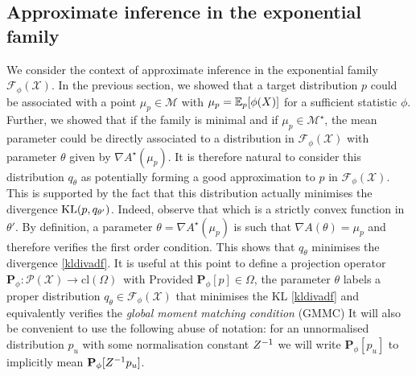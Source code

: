 \subsection{Approximate inference in the exponential family}
%
We consider the context of approximate inference in the exponential family $\mathcal F_{\phi}(\mathcal X)$. In the previous section, we showed that a target distribution $p$ could be associated with a point $\mu_p\in\mathcal M$ with $\mu_p=\mathbb E_{p}[\phi(X)]$ for a sufficient statistic $\phi$. Further, we showed that if the family is minimal and if $\mu_p\in\mathcal M^{\star}$, the mean parameter could be directly associated to a distribution in $\mathcal F_{\phi}(\mathcal X)$ with parameter $\theta$ given by $\nabla A^{\star}(\mu_p)$. It is therefore natural to consider this distribution $q_{\theta}$ as potentially forming a good approximation to $p$ in $\mathcal F_{\phi}(\mathcal X)$.
%
This is supported by the fact that this distribution actually minimises the divergence $\mathrm{KL}\!\left(p,q_{\theta'}\right)$. Indeed, observe that
%
%
which is a strictly convex function in $\theta'$. By definition, a parameter $\theta=\nabla A^{\star}(\mu_p)$ is such that $\nabla A(\theta)=\mu_p$ and therefore verifies the first order condition. This shows that $q_{\theta}$ minimises the divergence \eqref{kldivadf}. It is useful at this point to define a projection operator $\mathbf P_{\phi}:\mathcal P(\mathcal X) \to \mathrm{cl}(\Omega)$\, with
%
%
Provided $\mathbf P_{\phi}[p] \in \Omega$, the parameter $\theta$ labels a proper distribution $q_{\theta}\in\mathcal F_{\phi}(\mathcal X)$ that minimises the KL \eqref{kldivadf} and equivalently verifies the \emph{global moment matching condition} (GMMC) 
%
%
It will also be convenient to use the following abuse of notation: for an unnormalised distribution $p_{u}$ with some normalisation constant $Z^{-1}$ we will write $\mathbf P_{\phi}[p_{u}]$ to implicitly mean $\mathbf P_{\phi}[Z^{-1} p_{u}]$.

